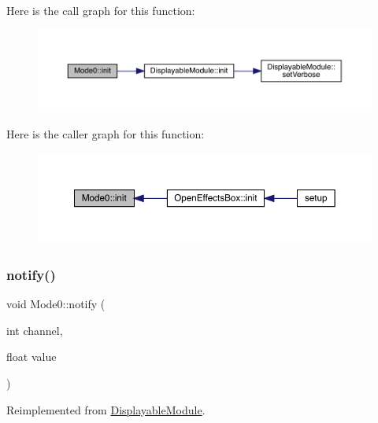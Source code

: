 Here is the call graph for this function\+:\nopagebreak
\begin{figure}[H]
\begin{center}
\leavevmode
\includegraphics[width=350pt]{class_mode0_a21802f200c6e3792ca5f8daf91ce910c_cgraph}
\end{center}
\end{figure}
Here is the caller graph for this function\+:\nopagebreak
\begin{figure}[H]
\begin{center}
\leavevmode
\includegraphics[width=350pt]{class_mode0_a21802f200c6e3792ca5f8daf91ce910c_icgraph}
\end{center}
\end{figure}
\mbox{\label{class_mode0_a743ebe3d0faccc421d06c9114026a099}} 
\subsubsection{\texorpdfstring{notify()}{notify()}}
{\footnotesize\ttfamily void Mode0\+::notify (\begin{DoxyParamCaption}\item[{int}]{channel,  }\item[{float}]{value }\end{DoxyParamCaption})\hspace{0.3cm}{\ttfamily [virtual]}}



Reimplemented from \mbox{\hyperlink{class_displayable_module_a8ae5383931f10c54cff2feef2bc07dee}{Displayable\+Module}}.

